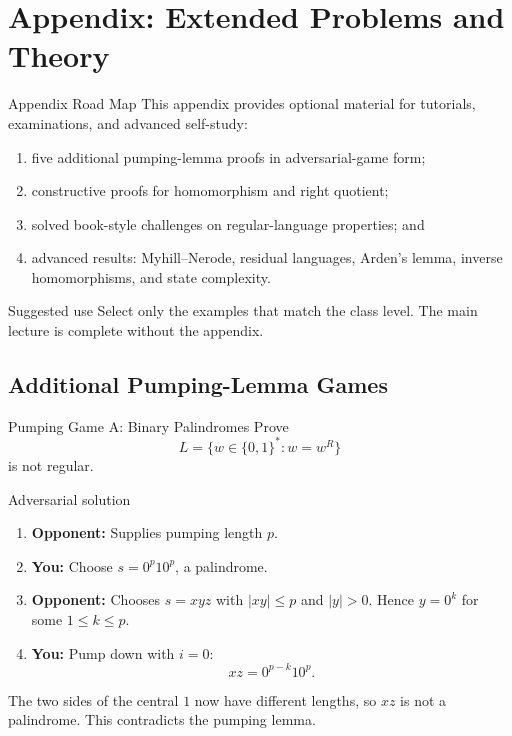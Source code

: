 \documentclass[10pt]{beamer}
\begin{document}
\appendix
\section{Appendix: Extended Problems and Theory}

\begin{frame}{Appendix Road Map}
  \small
  This appendix provides optional material for tutorials, examinations, and
  advanced self-study:
  \begin{enumerate}
    \item five additional pumping-lemma proofs in adversarial-game form;
    \item constructive proofs for homomorphism and right quotient;
    \item solved book-style challenges on regular-language properties; and
    \item advanced results: Myhill--Nerode, residual languages, Arden's lemma,
      inverse homomorphisms, and state complexity.
  \end{enumerate}
  \begin{block}{Suggested use}
    Select only the examples that match the class level. The main lecture is
    complete without the appendix.
  \end{block}
\end{frame}

\subsection{Additional Pumping-Lemma Games}

\begin{frame}{Pumping Game A: Binary Palindromes}
  \small
  Prove
  \[
    L=\{w\in\{0,1\}^*:w=w^R\}
  \]
  is not regular.
  \begin{alertblock}{Adversarial solution}
    \begin{enumerate}
      \item \textbf{Opponent:} Supplies pumping length $p$.
      \item \textbf{You:} Choose $s=0^p10^p$, a palindrome.
      \item \textbf{Opponent:} Chooses $s=xyz$ with
        $|xy|\le p$ and $|y|>0$. Hence $y=0^k$ for some $1\le k\le p$.
      \item \textbf{You:} Pump down with $i=0$:
        \[
          xz=0^{p-k}10^p.
        \]
    \end{enumerate}
  \end{alertblock}
  The two sides of the central $1$ now have different lengths, so $xz$ is not
  a palindrome. This contradicts the pumping lemma.
\end{frame}
\end{document}
